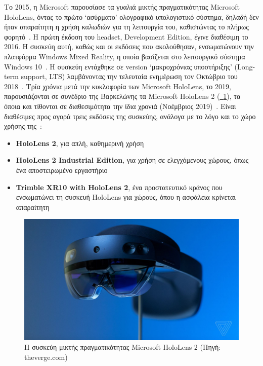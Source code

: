 
Το 2015, η Microsoft παρουσίασε τα γυαλιά μικτής πραγματικότητας Microsoft HoloLens, όντας το πρώτο `ασύρματο' ολογραφικό υπολογιστικό σύστημα, δηλαδή δεν ήταν απαραίτητη η χρήση καλωδιών για τη λειτουργία του, καθιστώντας το πλήρως φορητό~\cite{a2021_hololens}. Η πρώτη έκδοση του headset, Development Edition, έγινε διαθέσιμη το 2016. Η συσκεύη αυτή, καθώς και οι εκδόσεις που ακολούθησαν, ενσωματώνουν την πλατφόρμα Windows Mixed Reality, η οποία βασίζεται στο λειτουργικό σύστημα Windows 10~\cite{kipman_2016_announcing}. Η συσκεύη εντάχθηκε σε version `μακροχρόνιας υποστήριξης' (Long-term support, LTS) λαμβάνοντας την τελευταία ενημέρωση τον Οκτώβριο του 2018~\cite{a2023_hololens}\cite{bowden_2019_the}. Τρία χρόνια μετά την κυκλοφορία των Microsoft HoloLens, το 2019, παρουσιάζονται σε συνέδριο της Βαρκελώνης τα Microsoft HoloLens 2 (\hyperref[fig:hololensDevice]{\schema~\ref*{fig:hololensDevice}}), τα όποια και τίθονται σε διαθεσιμότητα την ίδια χρονιά (Νοέμβριος 2019)~\cite{white_2019_microsoft}. Είναι διαθέσιμες προς αγορά τρεις εκδόσεις της συσκεύης, ανάλογα με το λόγο και το χώρο χρήσης της~\cite{microsoft_2019_hololens}: 
\begin{itemize}
    \item \textbf{HoloLens 2}, για απλή, καθημερινή χρήση
    \item \textbf{HoloLens 2 Industrial Edition}, για χρήση σε ελεγχόμενους χώρους, όπως ένα αποστειρωμένο εργαστήριο
    \item \textbf{Trimble XR10 with HoloLens 2}, ένα προστατευτικό κράνος που ενσωματώνει τη συσκευή HoloLens για χώρους, όπου η ασφάλεια κρίνεται απαραίτητη
\end{itemize}
\begin{figure}[!ht]
    \centering
    \includegraphics[width=130mm]{images/microsoft_hololens_2.jpg}
    \caption{Η συσκεύη μικτής πραγματικότητας Microsoft HoloLens 2 {\footnotesize (Πηγή: theverge.com)}}\label{fig:hololensDevice}
\end{figure}

